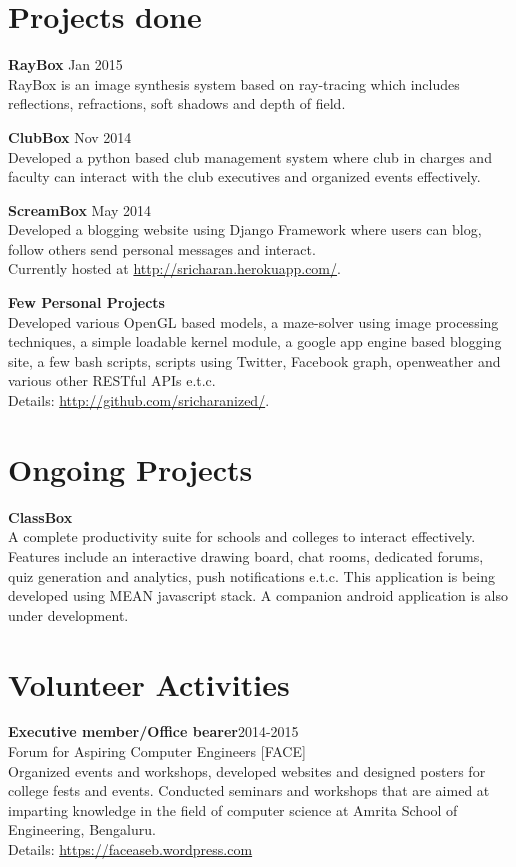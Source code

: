 \documentclass[margin]{res}
\begin{document}
\begin{resume}
 \section{Projects done}
{\bf RayBox} \hfill Jan 2015 \\ RayBox is an image synthesis system based on ray-tracing which includes reflections, refractions, soft shadows and depth of field.

{\bf ClubBox} \hfill Nov 2014 \\ Developed a python based club management system where club in 
charges and faculty can interact with the club executives and organized events effectively.

{\bf ScreamBox} \hfill May 2014 \\ Developed a blogging website using Django Framework where users can blog, follow others send personal messages and interact.\\ Currently hosted at \underline{http://sricharan.herokuapp.com/}.

{\bf Few Personal Projects} \\ Developed various OpenGL based models, a maze-solver using image processing techniques, a simple loadable kernel module, a google app engine based blogging site, a few bash scripts, scripts using Twitter, Facebook graph, openweather and various other RESTful APIs e.t.c. \\Details: \underline{http://github.com/sricharanized/}.

 \section{Ongoing Projects}
{\bf ClassBox} \\ A complete productivity suite for schools and colleges to interact effectively. Features include an interactive drawing board, chat rooms, dedicated forums, quiz generation and analytics, push notifications e.t.c. This application is being developed using MEAN javascript stack. A companion android application is also under development.



\section{Volunteer  Activities} 
{\bf Executive member/Office bearer}\hfill  2014-2015\\ Forum for Aspiring Computer Engineers [FACE] \\Organized events and workshops, developed websites and designed posters for college fests and events. Conducted seminars and workshops that are aimed at imparting knowledge in the field of computer science at Amrita School of Engineering, Bengaluru. \\ Details: \underline{https://faceaseb.wordpress.com}
                


\end{resume}
\end{document}
